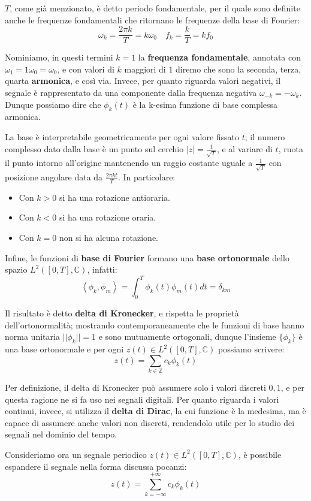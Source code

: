 \noindent $T$, come già menzionato, è detto periodo fondamentale, per il quale sono definite anche le frequenze fondamentali che ritornano le frequenze
della base di Fourier: \[
    \omega_k = \frac{2\pi k}{T} = k\omega_0\quad f_k = \frac{k}{T} = kf_0
\]

\noindent Nominiamo, in questi termini $k=1$ la \textbf{frequenza fondamentale}, annotata con $\omega_1 = 1\omega_0 = \omega_0$, e con valori di $k$
maggiori di $1$ diremo che sono la seconda, terza, quarta \textbf{armonica}, e così via. Invece, per quanto riguarda valori negativi, il segnale è
rappresentato da una componente dalla frequenza negativa $\omega_{-k} = -\omega_k$. Dunque possiamo dire che $\phi_k(t)$ è la k-esima funzione di base
complessa armonica.\par
La base è interpretabile geometricamente per ogni valore fissato $t$; il numero complesso dato dalla base è un punto sul cerchio $|z| =
\frac{1}{\sqrt{T}}$, e al variare di $t$, ruota il punto intorno all'origine mantenendo un raggio costante uguale a $\frac{1}{\sqrt{T}}$ con posizione
angolare data da $\frac{2\pi kt}{T}$. In particolare: \begin{itemize}
    \item Con $k>0$ si ha una rotazione antioraria.
    \item Con $k<0$ si ha una rotazione oraria.
    \item Con $k=0$ non si ha alcuna rotazione.
\end{itemize}

\noindent Infine, le funzioni di \textbf{base di Fourier} formano una \textbf{base ortonormale} dello spazio $L^2([0,T], \mathbb{C})$, infatti: \[
    \left<\phi_k, \phi_m \right> = \int_{0}^{T} \phi_k(t)\overline{\phi_m(t)} dt = \delta_{km}
\]

\noindent Il risultato è detto \textbf{delta di Kronecker}, e rispetta le proprietà dell'ortonormalità; mostrando contemporaneamente che le funzioni di
base hanno norma unitaria $||\phi_k|| = 1$ e sono mutuamente ortogonali, dunque l'insieme $\{\phi_k\}$ è una base ortonormale e per ogni
$z(t)\in L^2([0,T], \mathbb{C})$ possiamo scrivere: \[
    z(t) = \sum_{k\in \mathbb{Z}} c_k\phi_k(t)
\]

\noindent Per definizione, il delta di Kronecker può assumere solo i valori discreti $0,1$, e per questa ragione ne si fa uso nei segnali digitali. Per
quanto riguarda i valori continui, invece, si utilizza il \textbf{delta di Dirac}, la cui funzione è la medesima, ma è capace di assumere anche valori
non discreti, rendendolo utile per lo studio dei segnali nel dominio del tempo.\par
Consideriamo ora un segnale periodico $z(t)\in L^2([0,T], \mathbb{C})$, è possibile espandere il segnale nella forma discussa pocanzi: \[
    z(t) = \sum_{k = -\infty}^{+\infty} c_k\phi_k(t)
\]

